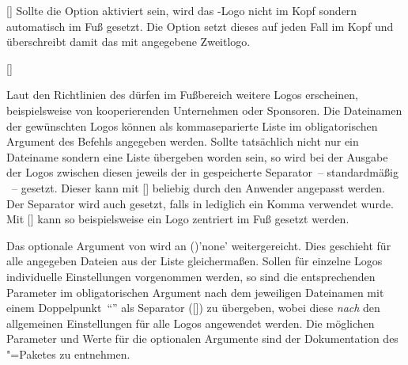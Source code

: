 \begin{Declaration*}{}
\begin{Declaration*}{}
\begin{Declaration*}{}
\begin{Declaration}{[\LParameter{}]}
Sollte die Option  aktiviert sein, wird das \DDC-Logo nicht im Kopf 
sondern automatisch im Fuß gesetzt. Die Option  setzt dieses 
auf jeden Fall im Kopf und überschreibt damit das mit  
angegebene Zweitlogo.
\end{Declaration}

\begin{Declaration}[v2.03]{%
  [\LParameter{}]%
}
\begin{Declaration}[v2.03]{}%
\printdeclarationlist%
%
%
%

Laut den Richtlinien des \CDs dürfen im Fußbereich weitere Logos erscheinen, 
beispielsweise von kooperierenden Unternehmen oder Sponsoren. Die Dateinamen 
der gewünschten Logos können als kommaseparierte Liste im obligatorischen 
Argument des Befehls  angegeben werden. Sollte tatsächlich 
nicht nur ein Dateiname sondern eine Liste übergeben worden sein, so wird bei 
der Ausgabe der Logos zwischen diesen jeweils der in  
gespeicherte Separator~-- standardmäßig ~-- gesetzt. Dieser kann 
mit [\PParameter{\dots}] 
beliebig durch den Anwender angepasst werden. Der Separator wird auch gesetzt, 
falls in  lediglich ein Komma verwendet wurde. Mit 
[] kann so beispielsweise ein 
Logo zentriert im Fuß gesetzt werden.

Das optionale Argument von  wird an 
()'none' weitergereicht. Dies 
geschieht für alle angegeben Dateien aus der Liste gleichermaßen. Sollen für 
einzelne Logos individuelle Einstellungen vorgenommen werden, so sind die 
entsprechenden Parameter im obligatorischen Argument nach dem jeweiligen 
Dateinamen mit einem Doppelpunkt~\enquote{\PValue{:}} als Separator 
([]) zu 
übergeben, wobei diese \emph{nach} den allgemeinen Einstellungen für alle Logos 
angewendet werden. Die möglichen Parameter und Werte für die optionalen 
Argumente sind der Dokumentation des "=Paketes zu entnehmen.
\end{Declaration}
\end{Declaration}


\end{Declaration*}
\end{Declaration*}
\end{Declaration*}
